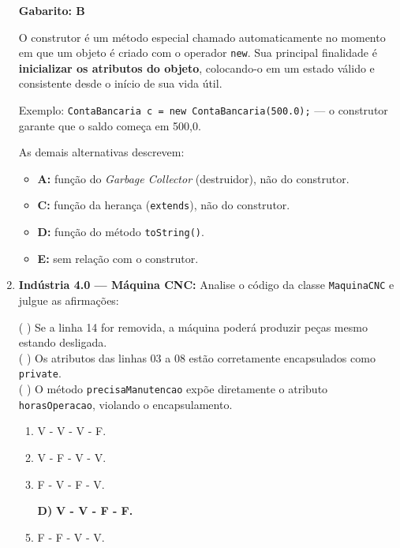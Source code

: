 \documentclass[12pt,a4paper]{article}
\begin{document}
\begin{enumerate}
\begin{tcolorbox}[respostabox]
\textbf{Gabarito: B}

O construtor é um método especial chamado automaticamente no momento em que um objeto é criado com o operador \texttt{new}. Sua principal finalidade é \textbf{inicializar os atributos do objeto}, colocando-o em um estado válido e consistente desde o início de sua vida útil.

Exemplo: \texttt{ContaBancaria c = new ContaBancaria(500.0);} — o construtor garante que o saldo começa em 500,0.

As demais alternativas descrevem:
\begin{itemize}
    \item \textbf{A:} função do \textit{Garbage Collector} (destruidor), não do construtor.
    \item \textbf{C:} função da herança (\texttt{extends}), não do construtor.
    \item \textbf{D:} função do método \texttt{toString()}.
    \item \textbf{E:} sem relação com o construtor.
\end{itemize}
\end{tcolorbox}

\vspace{0.4cm}

\item \textbf{Indústria 4.0 — Máquina CNC:} Analise o código da classe \texttt{MaquinaCNC} e julgue as afirmações:

( ) Se a linha 14 for removida, a máquina poderá produzir peças mesmo estando desligada. \\
( ) Os atributos das linhas 03 a 08 estão corretamente encapsulados como \texttt{private}. \\
( ) O método \texttt{precisaManutencao} expõe diretamente o atributo \texttt{horasOperacao}, violando o encapsulamento.

    \begin{enumerate}[label=\Alph*)]
        \item V - V - V - F.
        \item V - F - V - V.
        \item F - V - F - V.
        \item[\textbf{D)}] \textbf{V - V - F - F.} \checkmark
        \item F - F - V - V.
    \end{enumerate}


\end{enumerate}
\end{document}
